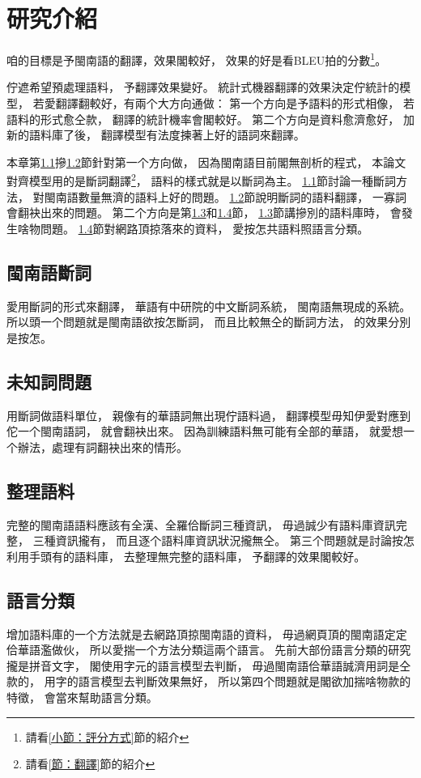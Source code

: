 \chapter{研究介紹}
\label{章：研究介紹}

咱的目標是予閩南語的翻譯，效果閣較好，
效果的好是看BLEU拍的分數\footnote{請看\ref{小節：評分方式}節的紹介}。

佇遮希望預處理語料，
予翻譯效果變好。
統計式機器翻譯的效果決定佇統計的模型，
若愛翻譯翻較好，有兩个大方向通做：
第一个方向是予語料的形式相像，
若語料的形式愈仝款，
翻譯的統計機率會閣較好。
第二个方向是資料愈濟愈好，
加新的語料庫了後，
翻譯模型有法度揀著上好的語詞來翻譯。

本章第\ref{節：閩南語斷詞}摻\ref{節：未知詞問題}節針對第一个方向做，
因為閩南語目前閣無剖析的程式，
本論文對齊模型用的是斷詞翻譯\footnote{請看\ref{節：翻譯}節的紹介}，
語料的樣式就是以斷詞為主。
\ref{節：閩南語斷詞}節討論一種斷詞方法，
對閩南語數量無濟的語料上好的問題。
\ref{節：未知詞問題}節說明斷詞的語料翻譯，
一寡詞會翻袂出來的問題。
第二个方向是第\ref{節：整理語料}和\ref{節：語言分類}節，
\ref{節：整理語料}節講摻別的語料庫時，
會發生啥物問題。
\ref{節：語言分類}節對網路頂掠落來的資料，
愛按怎共語料照語言分類。

\section{閩南語斷詞}
\label{節：閩南語斷詞}
愛用斷詞的形式來翻譯，
華語有中研院的中文斷詞系統，
閩南語無現成的系統。
所以頭一个問題就是閩南語欲按怎斷詞，
而且比較無仝的斷詞方法，
的效果分別是按怎。

\section{未知詞問題}
\label{節：未知詞問題}
用斷詞做語料單位，
親像有的華語詞無出現佇語料過，
翻譯模型毋知伊愛對應到佗一个閩南語詞，
就會翻袂出來。
因為訓練語料無可能有全部的華語，
就愛想一个辦法，處理有詞翻袂出來的情形。
\section{整理語料}
\label{節：整理語料}
完整的閩南語語料應該有全漢、全羅佮斷詞三種資訊，
毋過誠少有語料庫資訊完整，
三種資訊攏有，
而且逐个語料庫資訊狀況攏無仝。
第三个問題就是討論按怎利用手頭有的語料庫，
去整理無完整的語料庫，
予翻譯的效果閣較好。


\section{語言分類}
\label{節：語言分類}
增加語料庫的一个方法就是去網路頂掠閩南語的資料，
毋過網頁頂的閩南語定定佮華語濫做伙，
所以愛揣一个方法分類這兩个語言。
先前大部份語言分類的研究攏是拼音文字，
閣使用字元的語言模型去判斷，
毋過閩南語佮華語誠濟用詞是仝款的，
用字的語言模型去判斷效果無好，
所以第四个問題就是閣欲加揣啥物款的特徵，
會當來幫助語言分類。
